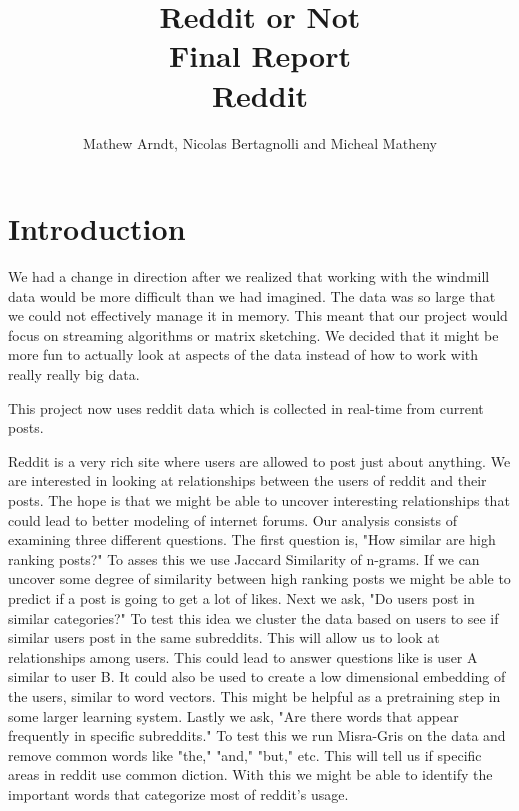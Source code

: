 \documentclass[12pt]{article}
\numberwithin{equation}{section}
\begin{document}
\title{Reddit or Not\\ Final Report \\ Reddit }
\author{Mathew Arndt, Nicolas Bertagnolli and Micheal Matheny}
\date{}
\maketitle
{}
\newpage
  
\section*{Introduction}
		We had a change in direction after we realized that working with the windmill data would  be more difficult than we had imagined.  The data was so large that we could not effectively manage it in memory. This meant that our project would focus on streaming algorithms or matrix sketching.  We decided that it might be more fun to actually look at aspects of the data instead of how to work with really really big data.   \newline

		This project now uses reddit data which is collected in real-time from current posts.  \newline
		
		Reddit is a very rich site where users are allowed to post just about anything.  We are interested in looking at relationships between the users of reddit and their posts.  The hope is that we might be able to uncover interesting relationships that could lead to better modeling of internet forums.  Our analysis consists of examining three different questions. The first question is, "How similar are high ranking posts?"  To asses this we use Jaccard Similarity of n-grams.  If we can uncover some degree of similarity between high ranking posts we might be able to predict if a post is going to get a lot of likes. Next we ask, "Do users post in similar categories?"  To test this idea we cluster the data based on users to see if similar users post in the same subreddits.  This will allow us to look at relationships among users.  This could lead to answer questions like is user A similar to user B.  It could also be used to create a low dimensional embedding of the users, similar to word vectors.  This might be helpful as a pretraining step in some larger learning system. Lastly we ask, "Are there words that appear frequently in specific subreddits." To test this we run Misra-Gris on the data and remove common words like "the," "and," "but," etc.  This will tell us if specific areas in reddit use common diction.  With this we might be able to identify the important words that categorize most of reddit's usage.
		
\end{document}

